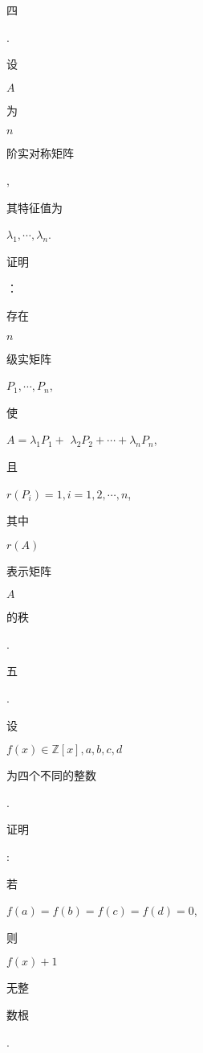\documentclass[10pt]{article}
\begin{document}
\begin{CJK}{UTF8}{mj}四\end{CJK}. \begin{CJK}{UTF8}{mj}设\end{CJK} $A$ \begin{CJK}{UTF8}{mj}为\end{CJK} $n$ \begin{CJK}{UTF8}{mj}阶实对称矩阵\end{CJK}, \begin{CJK}{UTF8}{mj}其特征值为\end{CJK} $\lambda_{1}, \cdots, \lambda_{n}$. \begin{CJK}{UTF8}{mj}证明\end{CJK}：\begin{CJK}{UTF8}{mj}存在\end{CJK} $n$ \begin{CJK}{UTF8}{mj}级实矩阵\end{CJK} $P_{1}, \cdots, P_{n}$, \begin{CJK}{UTF8}{mj}使\end{CJK} $A=\lambda_{1} P_{1}+$ $\lambda_{2} P_{2}+\cdots+\lambda_{n} P_{n}$, \begin{CJK}{UTF8}{mj}且\end{CJK} $r\left(P_{i}\right)=1, i=1,2, \cdots, n$, \begin{CJK}{UTF8}{mj}其中\end{CJK} $r(A)$ \begin{CJK}{UTF8}{mj}表示矩阵\end{CJK} $A$ \begin{CJK}{UTF8}{mj}的秩\end{CJK}.

\begin{CJK}{UTF8}{mj}五\end{CJK}. \begin{CJK}{UTF8}{mj}设\end{CJK} $f(x) \in \mathbb{Z}[x], a, b, c, d$ \begin{CJK}{UTF8}{mj}为四个不同的整数\end{CJK}. \begin{CJK}{UTF8}{mj}证明\end{CJK}: \begin{CJK}{UTF8}{mj}若\end{CJK} $f(a)=f(b)=f(c)=f(d)=0$, \begin{CJK}{UTF8}{mj}则\end{CJK} $f(x)+1$ \begin{CJK}{UTF8}{mj}无整\end{CJK} \begin{CJK}{UTF8}{mj}数根\end{CJK}.
\end{document}
